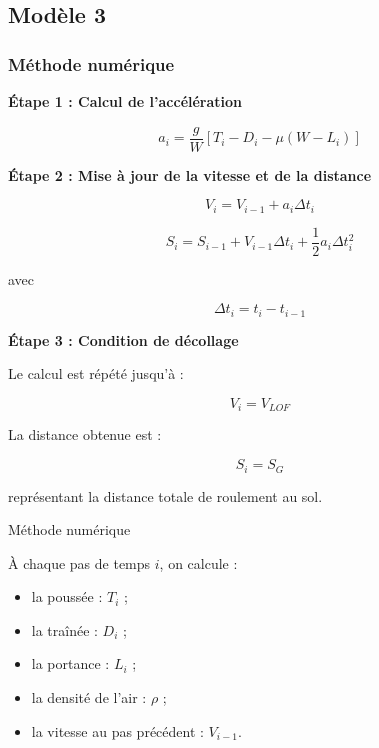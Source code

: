 	
	
	
		\subsection{Modèle 3}
		
		
			
			
			\begin{frame}
				
				\frametitle{Méthode numérique}
				
				\textbf{Étape 1 : Calcul de l'accélération}
				
				\[
				a_i=\frac{g}{W}\left[T_i-D_i-\mu(W-L_i)\right]
				\]
				
				\textbf{Étape 2 : Mise à jour de la vitesse et de la distance}
				
				\[
				V_i=V_{i-1}+a_i\Delta t_i
				\]
				
				\[
				S_i=S_{i-1}+V_{i-1}\Delta t_i+\frac{1}{2}a_i\Delta t_i^2
				\]
				
				avec
				
				\[
				\Delta t_i=t_i-t_{i-1}
				\]
				
				\textbf{Étape 3 : Condition de décollage}
				
				Le calcul est répété jusqu'à :
				
				\[
				V_i=V_{LOF}
				\]
				
				La distance obtenue est :
				
				\[
				S_i=S_G
				\]
				
				représentant la distance totale de roulement au sol.
				
			\end{frame}
			
			
			\begin{frame}{Méthode numérique}
				
					À chaque pas de temps $i$, on calcule :
					
					\begin{itemize}
						\item la poussée : $T_i$ ;
						\item la traînée : $D_i$ ;
						\item la portance : $L_i$ ;
						\item la densité de l'air : $\rho$ ;
						\item la vitesse au pas précédent : $V_{i-1}$.
					\end{itemize}
					
			\end{frame}
				
